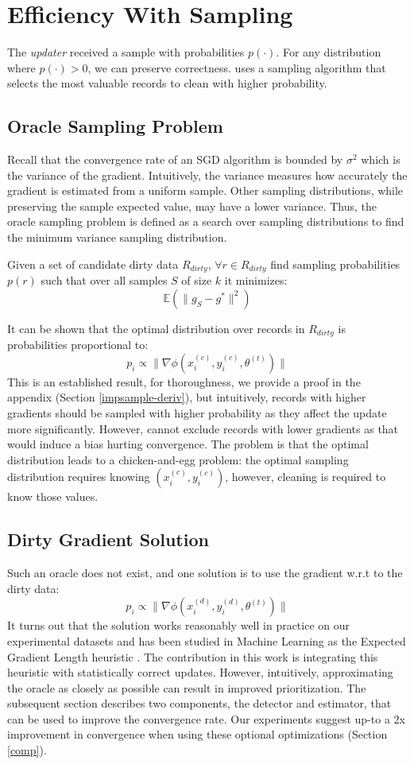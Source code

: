\section{Efficiency With Sampling}\label{dist-samp}
The \emph{updater} received a sample with probabilities $p(\cdot)$.
For any distribution where  $p(\cdot) > 0$, we can preserve correctness.
\sys uses a sampling algorithm that selects the most valuable records to clean with higher probability. 

\subsection{Oracle Sampling Problem}
Recall that the convergence rate of an SGD algorithm is bounded by $\sigma^2$ which is the variance of the gradient.
Intuitively, the variance measures how accurately the gradient is estimated from a uniform sample.
Other sampling distributions, while preserving the sample expected value, may have a lower variance.
Thus, the oracle sampling problem is defined as a search over sampling distributions to find the minimum variance sampling distribution.

\begin{definition}
Given a set of candidate dirty data $R_{dirty}$, $\forall r \in R_{dirty}$ find sampling probabilities $p(r)$ such that over all samples $S$ of size $k$ it minimizes:
\[
\mathbb{E}(\|g_S - g^*\|^2)
\]
\end{definition}
It can be shown that the optimal distribution over records in $R_{dirty}$ is probabilities proportional to:
\[
p_i \propto \|\nabla\phi(x^{(c)}_i,y^{(c)}_i,\theta^{(t)})\|
\]
This is an established result, for thoroughness, we provide a proof in the appendix (Section \ref{impsample-deriv}), but intuitively, records with higher gradients should be sampled with higher probability as they affect the update more significantly.
However, \sys cannot exclude records with lower gradients as that would induce a bias hurting convergence.
The problem is that the optimal distribution leads to a chicken-and-egg problem:
the optimal sampling distribution requires knowing $(x^{(c)}_i,y^{(c)}_i)$, however, cleaning is required to know those values.

\subsection{Dirty Gradient Solution}\label{dgsample}
Such an oracle does not exist, and one solution is to use the gradient w.r.t to the dirty data:
\[
p_i \propto \|\nabla\phi(x^{(d)}_i,y^{(d)}_i,\theta^{(t)})\|
\]
It turns out that the solution works reasonably well in practice on our experimental datasets and has been studied in Machine Learning as the Expected Gradient Length heuristic \cite{settles2010active}.
The contribution in this work is integrating this heuristic with statistically correct updates.
However, intuitively, approximating the oracle as closely as possible can result in improved prioritization.
The subsequent section describes two components, the detector and estimator, that can be used to improve the convergence rate.
Our experiments suggest up-to a 2x improvement in convergence when using these optional optimizations (Section \ref{comp}).